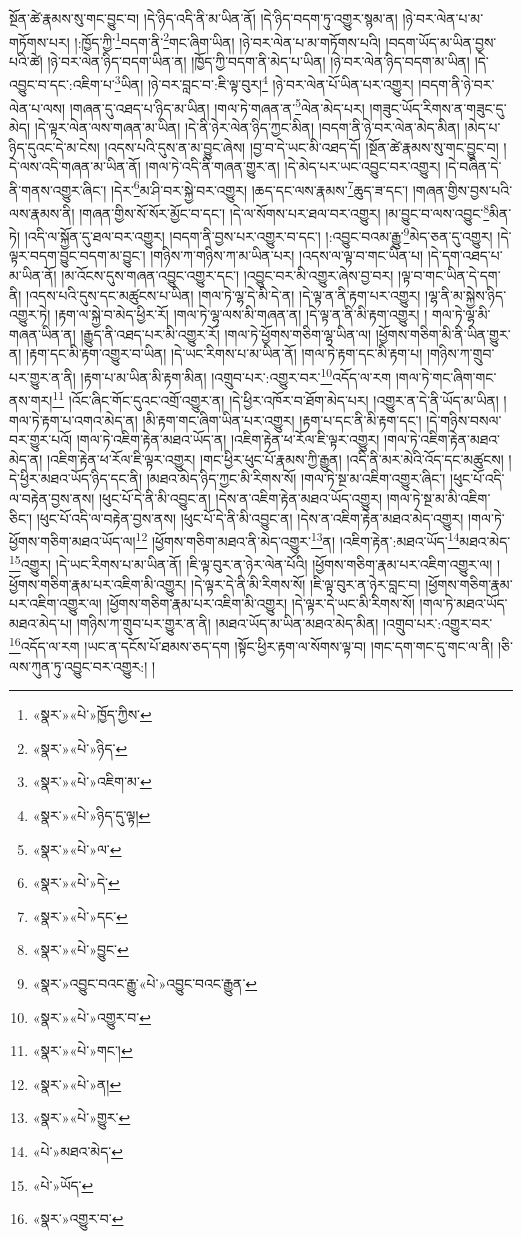 སྔོན་ཚེ་རྣམས་སུ་གང་བྱུང་བ། །དེ་ཉིད་འདི་ནི་མ་ཡིན་ནོ། །དེ་ཉིད་བདག་ཏུ་འགྱུར་སྙམ་ན། །ཉེ་བར་ལེན་པ་མ་གཏོགས་པར། །:ཁྱོད་ཀྱི་\footnote{«སྣར་»«པེ་»ཁྱོད་ཀྱིས་}བདག་ནི་\footnote{«སྣར་»«པེ་»ཉིད་}གང་ཞིག་ཡིན། །ཉེ་བར་ལེན་པ་མ་གཏོགས་པའི། །བདག་ཡོད་མ་ཡིན་བྱས་པའི་ཚེ། །ཉེ་བར་ལེན་ཉིད་བདག་ཡིན་ན། །ཁྱོད་ཀྱི་བདག་ནི་མེད་པ་ཡིན། །ཉེ་བར་ལེན་ཉིད་བདག་མ་ཡིན། །དེ་འབྱུང་བ་དང་:འཇིག་པ་\footnote{«སྣར་»«པེ་»འཇིག་མ་}ཡིན། །ཉེ་བར་བླང་བ་:ཇི་ལྟ་བུར།\footnote{«སྣར་»«པེ་»ཉིད་དུ་ལྟ།} །ཉེ་བར་ལེན་པོ་ཡིན་པར་འགྱུར། །བདག་ནི་ཉེ་བར་ལེན་པ་ལས། །གཞན་དུ་འཐད་པ་ཉིད་མ་ཡིན། །གལ་ཏེ་གཞན་ན་\footnote{«སྣར་»«པེ་»ལ་}ལེན་མེད་པར། །གཟུང་ཡོད་རིགས་ན་གཟུང་དུ་མེད། །དེ་ལྟར་ལེན་ལས་གཞན་མ་ཡིན། །དེ་ནི་ཉེར་ལེན་ཉིད་ཀྱང་མིན། །བདག་ནི་ཉེ་བར་ལེན་མེད་མིན། །མེད་པ་ཉིད་དུའང་དེ་མ་ངེས། །འདས་པའི་དུས་ན་མ་བྱུང་ཞེས། །བྱ་བ་དེ་ཡང་མི་འཐད་དོ། །སྔོན་ཚེ་རྣམས་སུ་གང་བྱུང་བ། །དེ་ལས་འདི་གཞན་མ་ཡིན་ནོ། །གལ་ཏེ་འདི་ནི་གཞན་གྱུར་ན། །དེ་མེད་པར་ཡང་འབྱུང་བར་འགྱུར། །དེ་བཞིན་དེ་ནི་གནས་འགྱུར་ཞིང་། །དེར་\footnote{«སྣར་»«པེ་»དེ་}མ་ཤི་བར་སྐྱེ་བར་འགྱུར། །ཆད་དང་ལས་རྣམས་\footnote{«སྣར་»«པེ་»དང་}ཆུད་ཟ་དང་། །གཞན་གྱིས་བྱས་པའི་ལས་རྣམས་ནི། །གཞན་གྱིས་སོ་སོར་མྱོང་བ་དང་། །དེ་ལ་སོགས་པར་ཐལ་བར་འགྱུར། །མ་བྱུང་བ་ལས་འབྱུང་\footnote{«སྣར་»«པེ་»བྱུང་}མིན་ཏེ། །འདི་ལ་སྐྱོན་དུ་ཐལ་བར་འགྱུར། །བདག་ནི་བྱས་པར་འགྱུར་བ་དང་། །:འབྱུང་བའམ་རྒྱུ་\footnote{«སྣར་»འབྱུང་བའང་རྒྱུ་«པེ་»འབྱུང་བའང་རྒྱུན་}མེད་ཅན་དུ་འགྱུར། །དེ་ལྟར་བདག་བྱུང་བདག་མ་བྱུང་། །གཉིས་ཀ་གཉིས་ཀ་མ་ཡིན་པར། །འདས་ལ་ལྟ་བ་གང་ཡིན་པ། །དེ་དག་འཐད་པ་མ་ཡིན་ནོ། །མ་འོངས་དུས་གཞན་འབྱུང་འགྱུར་དང་། །འབྱུང་བར་མི་འགྱུར་ཞེས་བྱ་བར། །ལྟ་བ་གང་ཡིན་དེ་དག་ནི། །འདས་པའི་དུས་དང་མཚུངས་པ་ཡིན། །གལ་ཏེ་ལྷ་དེ་མི་དེ་ན། །དེ་ལྟ་ན་ནི་རྟག་པར་འགྱུར། །ལྷ་ནི་མ་སྐྱེས་ཉིད་འགྱུར་ཏེ། །རྟག་ལ་སྐྱེ་བ་མེད་ཕྱིར་རོ། །གལ་ཏེ་ལྷ་ལས་མི་གཞན་ན། །དེ་ལྟ་ན་ནི་མི་རྟག་འགྱུར། །
གལ་ཏེ་ལྷ་མི་གཞན་ཡིན་ན། །རྒྱུད་ནི་འཐད་པར་མི་འགྱུར་རོ། །གལ་ཏེ་ཕྱོགས་གཅིག་ལྷ་ཡིན་ལ། །ཕྱོགས་གཅིག་མི་ནི་ཡིན་གྱུར་ན། །རྟག་དང་མི་རྟག་འགྱུར་བ་ཡིན། །དེ་ཡང་རིགས་པ་མ་ཡིན་ནོ། །གལ་ཏེ་རྟག་དང་མི་རྟག་པ། །གཉིས་ཀ་གྲུབ་པར་གྱུར་ན་ནི། །རྟག་པ་མ་ཡིན་མི་རྟག་མིན། །འགྲུབ་པར་:འགྱུར་བར་\footnote{«སྣར་»«པེ་»འགྱུར་བ་}འདོད་ལ་རག །གལ་ཏེ་གང་ཞིག་གང་ནས་གར།\footnote{«སྣར་»«པེ་»གང་།} །འོང་ཞིང་གོང་དུའང་འགྲོ་འགྱུར་ན། །དེ་ཕྱིར་འཁོར་བ་ཐོག་མེད་པར། །འགྱུར་ན་དེ་ནི་ཡོད་མ་ཡིན། །གལ་ཏེ་རྟག་པ་འགའ་མེད་ན། །མི་རྟག་གང་ཞིག་ཡིན་པར་འགྱུར། །རྟག་པ་དང་ནི་མི་རྟག་དང་། །དེ་གཉིས་བསལ་བར་གྱུར་པའོ། །གལ་ཏེ་འཇིག་རྟེན་མཐའ་ཡོད་ན། །འཇིག་རྟེན་ཕ་རོལ་ཇི་ལྟར་འགྱུར། །གལ་ཏེ་འཇིག་རྟེན་མཐའ་མེད་ན། །འཇིག་རྟེན་ཕ་རོལ་ཇི་ལྟར་འགྱུར། །གང་ཕྱིར་ཕུང་པོ་རྣམས་ཀྱི་རྒྱུན། །འདི་ནི་མར་མེའི་འོད་དང་མཚུངས། །དེ་ཕྱིར་མཐའ་ཡོད་ཉིད་དང་ནི། །མཐའ་མེད་ཉིད་ཀྱང་མི་རིགས་སོ། །གལ་ཏེ་སྔ་མ་འཇིག་འགྱུར་ཞིང་། །ཕུང་པོ་འདི་ལ་བརྟེན་བྱས་ནས། །ཕུང་པོ་དེ་ནི་མི་འབྱུང་ན། །དེས་ན་འཇིག་རྟེན་མཐའ་ཡོད་འགྱུར། །གལ་ཏེ་སྔ་མ་མི་འཇིག་ཅིང་། །ཕུང་པོ་འདི་ལ་བརྟེན་བྱས་ནས། །ཕུང་པོ་དེ་ནི་མི་འབྱུང་ན། །དེས་ན་འཇིག་རྟེན་མཐའ་མེད་འགྱུར། །གལ་ཏེ་ཕྱོགས་གཅིག་མཐའ་ཡོད་ལ།\footnote{«སྣར་»«པེ་»ན།} །ཕྱོགས་གཅིག་མཐའ་ནི་མེད་འགྱུར་\footnote{«སྣར་»«པེ་»གྱུར་}ན། །འཇིག་རྟེན་:མཐའ་ཡོད་\footnote{«པེ་»མཐའ་མེད་}མཐའ་མེད་\footnote{«པེ་»ཡོད་}འགྱུར། །དེ་ཡང་རིགས་པ་མ་ཡིན་ནོ། །ཇི་ལྟ་བུར་ན་ཉེར་ལེན་པོའི། །ཕྱོགས་གཅིག་རྣམ་པར་འཇིག་འགྱུར་ལ། །ཕྱོགས་གཅིག་རྣམ་པར་འཇིག་མི་འགྱུར། །དེ་ལྟར་དེ་ནི་མི་རིགས་སོ། །ཇི་ལྟ་བུར་ན་ཉེར་བླང་བ། །ཕྱོགས་གཅིག་རྣམ་པར་འཇིག་འགྱུར་ལ། །ཕྱོགས་གཅིག་རྣམ་པར་འཇིག་མི་འགྱུར། །དེ་ལྟར་དེ་ཡང་མི་རིགས་སོ། །གལ་ཏེ་མཐའ་ཡོད་མཐའ་མེད་པ། །གཉིས་ཀ་གྲུབ་པར་གྱུར་ན་ནི། །མཐའ་ཡོད་མ་ཡིན་མཐའ་མེད་མིན། །འགྲུབ་པར་:འགྱུར་བར་\footnote{«སྣར་»འགྱུར་བ་}འདོད་ལ་རག །ཡང་ན་དངོས་པོ་ཐམས་ཅད་དག །སྟོང་ཕྱིར་རྟག་ལ་སོགས་ལྟ་བ། །གང་དག་གང་དུ་གང་ལ་ནི། །ཅི་ལས་ཀུན་ཏུ་འབྱུང་བར་འགྱུར:། །
